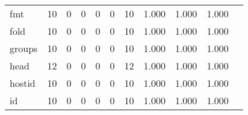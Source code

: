 \begin{longtable}{lp{1.2cm}p{1.2cm}p{1.2cm}p{1.2cm}p{1.2cm}p{1.2cm}p{1.2cm}p{1.2cm}p{1.2cm}p{1.2cm}}
fmt       &                                    10 &                                                  0 &                                                  0 &                                                  0 &                                                  0 &                                                 10 &                                         1.000 &                                              1.000 &                                              1.000 \\
fold      &                                    10 &                                                  0 &                                                  0 &                                                  0 &                                                  0 &                                                 10 &                                         1.000 &                                              1.000 &                                              1.000 \\
groups    &                                    10 &                                                  0 &                                                  0 &                                                  0 &                                                  0 &                                                 10 &                                         1.000 &                                              1.000 &                                              1.000 \\
head      &                                    12 &                                                  0 &                                                  0 &                                                  0 &                                                  0 &                                                 12 &                                         1.000 &                                              1.000 &                                              1.000 \\
hostid    &                                    10 &                                                  0 &                                                  0 &                                                  0 &                                                  0 &                                                 10 &                                         1.000 &                                              1.000 &                                              1.000 \\
id        &                                    10 &                                                  0 &                                                  0 &                                                  0 &                                                  0 &                                                 10 &                                         1.000 &                                              1.000 &                                              1.000 \\

\end{longtable}
